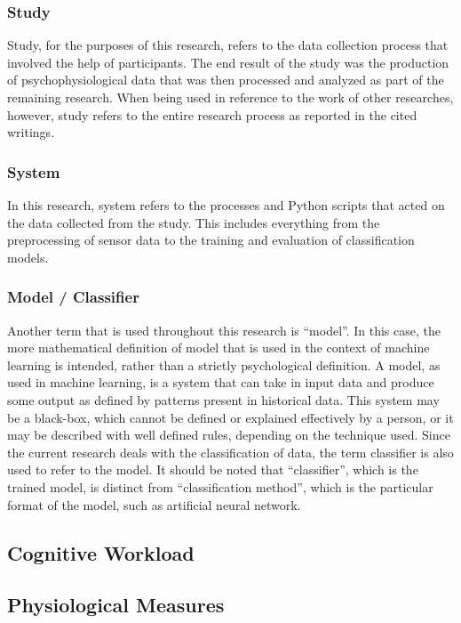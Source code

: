 \documentclass[11pt]{article}
\begin{document}
		\subsubsection{Study}
		Study, for the purposes of this research, refers to the data collection process that involved the help of participants. The end result of the study was the production of psychophysiological data that was then processed and analyzed as part of the remaining research.  When being used in reference to the work of other researches, however, study refers to the entire research process as reported in the cited writings.
		
		\subsubsection{System}
		In this research, system refers to the processes and Python scripts that acted on the data collected from the study. This includes everything from the preprocessing of sensor data to the training and evaluation of classification models. 		
		
		\subsubsection{Model / Classifier}
		Another term that is used throughout this research is ``model''. In this case, the more mathematical definition of model that is used in the context of machine learning is intended, rather than a strictly psychological definition. A model, as used in machine learning, is a system that can take in input data and produce some output as defined by patterns present in historical data. This system may be a black-box, which cannot be defined or explained effectively by a person, or it may be described with well defined rules, depending on the technique used. Since the current research deals with the classification of data, the term classifier is also used to refer to the model. It should be noted that ``classifier'', which is the trained model, is distinct from ``classification method'', which is the particular format of the model, such as artificial neural network.
	
	\subsection{Cognitive Workload}

	\subsection{Physiological Measures}
	
\end{document}
